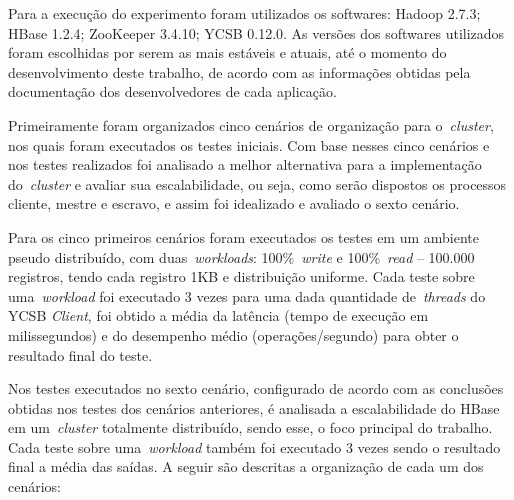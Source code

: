 \documentclass[12pt]{article}
\begin{document}
Para a execução do experimento foram utilizados os softwares: Hadoop 2.7.3; HBase 1.2.4; ZooKeeper 3.4.10; YCSB 0.12.0. As versões dos softwares utilizados foram escolhidas por serem as mais estáveis e atuais, até o momento do desenvolvimento deste trabalho, de acordo com as informações obtidas pela documentação dos desenvolvedores de cada aplicação.

Primeiramente foram organizados cinco cenários de organização para o~\emph{cluster}, nos quais foram executados os testes iniciais. Com base nesses cinco cenários e nos testes realizados foi analisado a melhor alternativa para a implementação do~\emph{cluster} e avaliar sua escalabilidade, ou seja, como serão dispostos os processos cliente, mestre e escravo, e assim foi idealizado e avaliado o sexto cenário.

Para os cinco primeiros cenários foram executados os testes em um ambiente pseudo distribuído, com duas~\emph{workloads}: 100\%~\emph{write} e 100\%~\emph{read} -- 100.000 registros, tendo cada registro 1KB e distribuição uniforme. Cada teste sobre uma~\emph{workload} foi executado 3 vezes para uma dada quantidade de~\emph{threads} do YCSB \textit{Client}, foi obtido a média da latência (tempo de execução em milissegundos) e do desempenho médio (operações/segundo) para obter o resultado final do teste.

Nos testes executados no sexto cenário, configurado de acordo com as conclusões obtidas nos testes dos cenários anteriores, é analisada a escalabilidade do HBase em um~\emph{cluster} totalmente distribuído, sendo esse, o foco principal do trabalho. Cada teste sobre uma~\emph{workload} também foi executado 3 vezes sendo o resultado final a média das saídas. A seguir são descritas a organização de cada um dos cenários:
\end{document}
